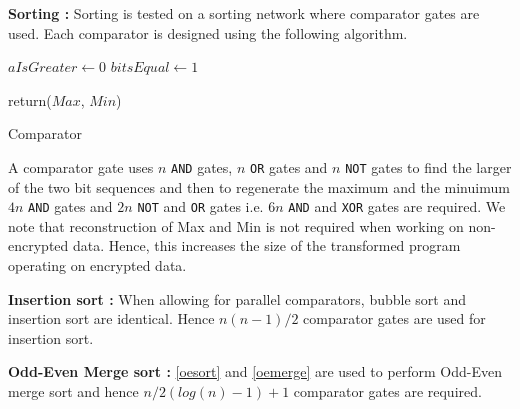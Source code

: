 \documentclass{acm_proc_article-sp}
\begin{document}
\textbf{Sorting :}
Sorting is tested on a sorting network where comparator gates are used. Each comparator is designed using the following algorithm. 


\linesnumbered

\begin{algorithm}[H]

 \SetVline



 $aIsGreater \leftarrow 0$\;
 $bitsEqual \leftarrow 1$\;

	




return($Max$, $Min$)

 \caption{Comparator\label{Code:algo}}

\end{algorithm}



A comparator gate uses $n$ \texttt{AND} gates, $n$ \texttt{OR} gates and $n$ \texttt{NOT} gates to find the larger of the two bit sequences and then to regenerate the maximum and the minuimum $4n$ \texttt{AND} gates and $2n$ \texttt{NOT} and \texttt{OR} gates i.e. $6n$ \texttt{AND} and \texttt{XOR} gates are required. We note that reconstruction of Max and  Min is not required when working on non-encrypted data. Hence, this increases the size of the transformed program operating on encrypted data.

\textbf{Insertion sort :} When allowing for parallel comparators, bubble sort and insertion sort are identical. Hence $n(n-1)/2$ comparator gates are used for insertion sort.

\textbf{Odd-Even Merge sort :} \autoref{oesort} and \autoref{oemerge} are used to perform Odd-Even merge sort and hence  $n/2(log(n)-1) + 1 $ comparator gates are required. 
\end{document}
